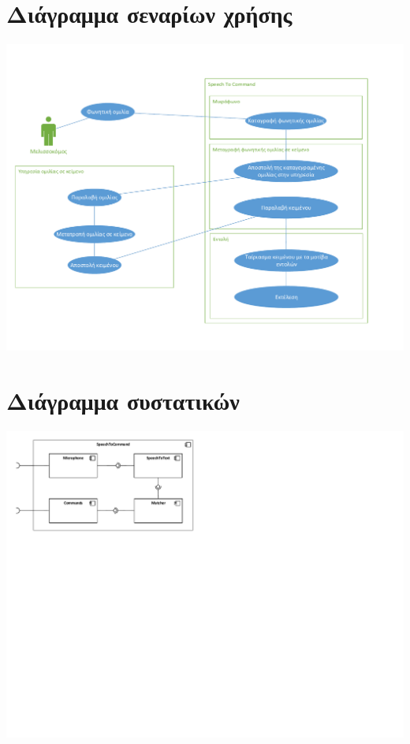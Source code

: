 \documentclass[oneside, 12pt]{book}
\begin{document}
\section{Διάγραμμα σεναρίων χρήσης}\label{sec:διάγραμμα-σεναρίων-χρήσης}
\includegraphics[scale=0.5]{uml/library_uml_use_case_diagram.pdf}
\newpage
\section{Διάγραμμα συστατικών}\label{sec:διάγραμμα-συστατικών}
\includegraphics{uml/library_uml_component_diagram.pdf}
\end{document}

